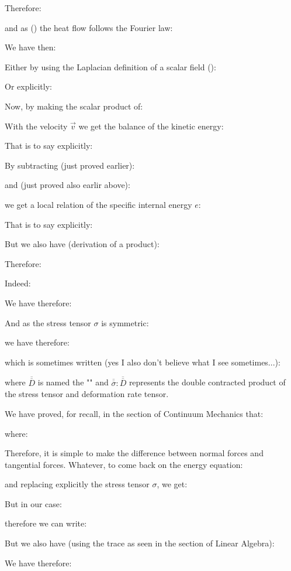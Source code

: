 	Therefore:
	
	and as () the heat flow follows the Fourier law:
	
	We have then:
	
	Either by using the Laplacian definition of a scalar field ():
	
	Or explicitly:
	
	Now, by making the scalar product of:
	
	With the velocity $\vec{v}$ we get the balance of the kinetic energy:
	
	That is to say explicitly:
	
	By subtracting (just proved earlier): 
	
	and (just proved also earlir above):
	
	we get a local relation of the specific internal energy $e$:
	
	That is to say explicitly:
	
	But we also have (derivation of a product):
	
	Therefore:
	
	Indeed:
	
	We have therefore:
	
	And as the stress tensor $\sigma$ is symmetric:
	
	we have therefore:
	
	which is sometimes written (yes I also don't believe what I see sometimes...):
	
	where $\overline{\overline{D}}$ is named the "" and $\overline{\overline{\sigma}} : \overline{\overline{D}}$ represents the double contracted product of the stress tensor and deformation rate tensor.

	We have proved, for recall, in the section of Continuum Mechanics that:
	
	where:
	
	Therefore, it is simple to make the difference between normal forces and tangential forces. Whatever, to come back on the energy equation:
	
	and replacing explicitly the stress tensor $\sigma$, we get:
	
	But in our case:
	
	therefore we can write:
	
	But we also have (using the trace as seen in the section of Linear Algebra):
	
	We have therefore:
	
